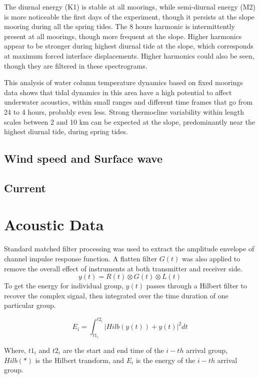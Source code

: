 The diurnal energy (K1) is stable at all moorings, while
semi-diurnal energy (M2) is more noticeable the first days of the
experiment, though it persists at the slope mooring during all the
spring tides. The 8 hours harmonic is intermittently present at all
moorings, though more frequent at the slope. Higher harmonics appear
to be stronger during highest diurnal tide at the slope, which
corresponds at maximum forced interface displacements. Higher
harmonics could also be seen, though they are filtered in these
spectrograms.

This analysis of water column temperature dynamics based on fixed
moorings data shows that tidal dynamics in this area have a high
potential to affect underwater acoustics, within small ranges and
different time frames that go from 24 to 4 hours, probably even
less. Strong thermocline variability within length scales between 2
and 10 km can be expected at the slope, predominantly near the
highest diurnal tide, during spring tides.

\subsection{Wind speed and Surface wave}

\subsection{Current}

\section{Acoustic Data}
Standard matched filter processing was used to extract the amplitude
envelope of channel impulse response function. A flatten filter
$G(t)$ was also applied to remove the overall effect of instruments
at both transmitter and receiver side.
\begin{equation}
y(t)=R(t)\otimes G(t)\otimes L(t)\label{eq1}
\end{equation}
To get the energy for individual group, $y(t)$ passes through a
Hilbert filter to recover the complex signal, then integrated over
the time duration of one particular group.

\begin{equation}E_i=\int_ {t1_i}^{t2_i} | Hilb(y(t)) +
y(t)|^2\label{eq2} dt\end{equation}

Where, $t1_i$ and $t2_i$ are the start and end time of the $i-th$
arrival group, $Hilb(*)$ is the Hilbert transform, and $E_i$ is the
energy of the $i-th$ arrival group.

